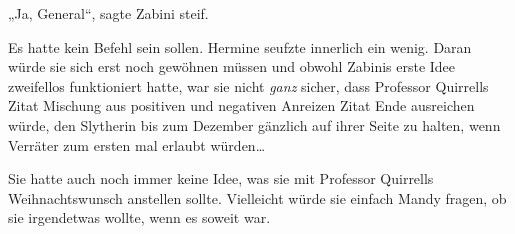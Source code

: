 „Ja, General“, sagte Zabini steif.

Es hatte kein Befehl sein sollen. Hermine seufzte innerlich ein wenig. Daran würde sie sich erst noch gewöhnen müssen und obwohl Zabinis erste Idee zweifellos funktioniert hatte, war sie nicht \emph{ganz} sicher, dass Professor Quirrells Zitat Mischung aus positiven und negativen Anreizen Zitat Ende ausreichen würde, den Slytherin bis zum Dezember gänzlich auf ihrer Seite zu halten, wenn Verräter zum ersten mal erlaubt würden…

Sie hatte auch noch immer keine Idee, was sie mit Professor Quirrells Weihnachtswunsch anstellen sollte. Vielleicht würde sie einfach Mandy fragen, ob sie irgendetwas wollte, wenn es soweit war.

